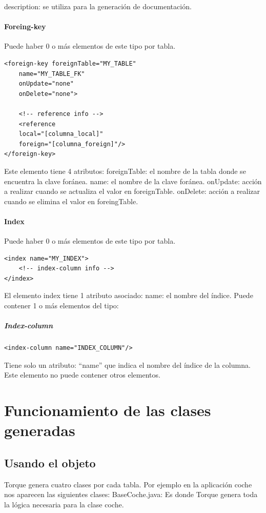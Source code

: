 \documentclass[12pt, oneside]{article}
\begin{document}
description: se utiliza para la generación de documentación.

\paragraph{Foreing-key}
Puede haber 0 o más elementos de este tipo por tabla.

\begin{lstlisting}
<foreign-key foreignTable="MY_TABLE"
	name="MY_TABLE_FK"
	onUpdate="none"
	onDelete="none">
	
	<!-- reference info -->
	<reference
	local="[columna_local]"
	foreign="[columna_foreign]"/>
</foreign-key>
\end{lstlisting}

Este elemento tiene 4 atributos:
foreignTable: el nombre de la tabla donde se encuentra la clave foránea.
name: el nombre de la clave foránea.
onUpdate: acción a realizar cuando se actualiza el valor en foreignTable.
onDelete: acción a realizar cuando se elimina el valor en foreingTable.

\paragraph{Index}
Puede haber 0 o más elementos de este tipo por tabla.

\begin{lstlisting}
<index name="MY_INDEX">
	<!-- index-column info -->
</index>
\end{lstlisting}

El elemento index tiene 1 atributo asociado:
name: el nombre del índice. 
Puede contener 1 o más elementos  del tipo:

\subparagraph{Index-column}
\begin{lstlisting}
<index-column name="INDEX_COLUMN"/>
\end{lstlisting}

Tiene solo un atributo: “name” que indica el nombre del índice de la columna. Este elemento no puede contener otros elementos.

\section{Funcionamiento de las clases generadas}
\subsection{Usando el objeto}
Torque genera cuatro clases por cada tabla. Por ejemplo en la aplicación coche nos aparecen las siguientes clases:
BaseCoche.java: Es donde Torque genera toda la lógica necesaria para la clase coche.
\end{document}
